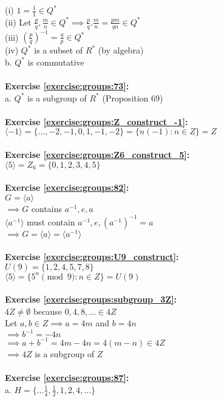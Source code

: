 (i) $1=\displaystyle\frac{1}{1}\in Q^*$\\
(ii) Let $\displaystyle\frac{p}{q},\frac{m}{n}\in Q^*\implies \frac{p}{q}.\frac{m}{n}=\frac{pm}{qn}\in Q^*$\\
(iii) $\displaystyle(\frac{p}{q})^{-1}=\frac{q}{p}\in Q^*$\\
(iv) $Q^*$ is a subset of $R^*$ (by algebra)\\
b. $Q^*$ is commutative\\
\\
\textbf{Exercise \ref{exercise:groups:73}:}\\
a. $Q^*$ is a subgroup of $R^*$ (Proposition 69)\\
\\
\textbf{Exercise \ref{exercise:groups:Z_construct_-1}:}\\
$\langle-1\rangle=\{...,-2,-1,0,1,-1,-2\}=\{n(-1):n\in Z\}=Z$\\
\\
\textbf{Exercise \ref{exercise:groups:Z6_construct_5}:}\\
$\langle 5\rangle=Z_6=\{0,1,2,3,4,5\}$\\
\\
\textbf{Exercise \ref{exercise:groups:82}:}\\
$G=\langle a\rangle$\\
$\implies G$ contains $a^{-1},e,a$\\
$\langle a^{-1}\rangle$ must contain $a^{-1},e,(a^{-1})^{-1}=a$\\
$\implies G=\langle a\rangle=\langle a^{-1}\rangle$\\
\\
\textbf{Exercise \ref{exercise:groups:U9_construct}:}\\
$U(9)=\{1,2,4,5,7,8\}$\\
$\langle 5\rangle=\{5^n\pmod{9}:n\in Z\}=U(9)$\\
\\
\textbf{Exercise \ref{exercise:groups:subgroup_3Z}:}\\
$4Z\neq\emptyset$ because $0,4,8,...\in 4Z$\\
Let $a,b\in Z\implies a=4m$ and $b=4n$\\
$\implies b^{-1}=-4n$\\
$\implies a+b^{-1}=4m-4n=4(m-n)\in 4Z$\\
$\implies 4Z$ is a subgroup of $Z$\\
\\
\textbf{Exercise \ref{exercise:groups:87}:}\\
a. $H=\{...\displaystyle\frac{1}{4},\frac{1}{2},1,2,4,...\}$\\
